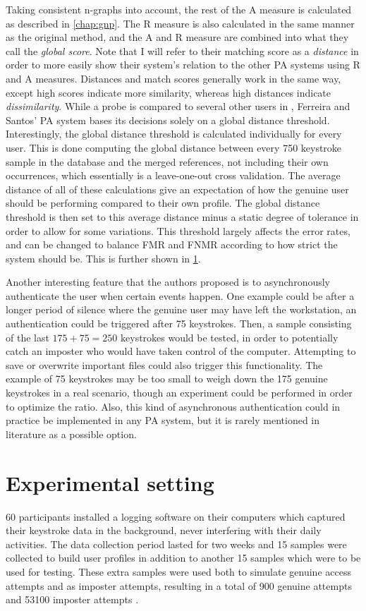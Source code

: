 \documentclass[informationsecurity]{gucmasterproject}
\begin{document}
Taking consistent n-graphs into account, the rest of the A measure is calculated as described in \cref{chap:gnp}. The R measure is also calculated in the same manner as the original method, and the A and R measure are combined into what they call the \textit{global score}.
Note that I will refer to their matching score as a \textit{distance} in order to more easily show their system's relation to the other PA systems using R and A measures. 
Distances and match scores generally work in the same way, except high scores indicate more similarity, whereas high distances indicate \textit{dissimilarity}.
While a probe is compared to several other users in \cite{gnp, Messerman}, Ferreira and Santos' PA system bases its decisions solely on a global distance threshold.
Interestingly, the global distance threshold is calculated individually for every user.
This is done computing the global distance between every 750 keystroke sample in the database and the merged references, not including their own occurrences, which essentially is a leave-one-out cross validation.
The average distance of all of these calculations give an expectation of how the genuine user should be performing compared to their own profile.
The global distance threshold is then set to this average distance minus a static degree of tolerance in order to allow for some variations.
This threshold largely affects the error rates, and can be changed to balance FMR and FNMR according to how strict the system should be.
This is further shown in \cref{sec:ferreira-experiment}.

Another interesting feature that the authors proposed is to asynchronously authenticate the user when certain events happen.
One example could be after a longer period of silence where the genuine user may have left the workstation, an authentication could be triggered after 75 keystrokes.
Then, a sample consisting of the last $175 + 75 = 250$ keystrokes would be tested, in order to potentially catch an imposter who would have taken control of the computer.
Attempting to save or overwrite important files could also trigger this functionality.
The example of 75 keystrokes may be too small to weigh down the 175 genuine keystrokes in a real scenario, though an experiment could be performed in order to optimize the ratio.
Also, this kind of asynchronous authentication could in practice be implemented in any PA system, but it is rarely mentioned in literature as a possible option.

\section{Experimental setting}
\label{sec:ferreira-experiment}
60 participants installed a logging software on their computers which captured their keystroke data in the background, never interfering with their daily activities.
The data collection period lasted for two weeks and 15 samples were collected to build user profiles in addition to another 15 samples which were to be used for testing.
These extra samples were used both to simulate genuine access attempts and as imposter attempts, resulting in a total of 900 genuine attempts and 53100 imposter attempts \cite{superResults}.
\end{document}
